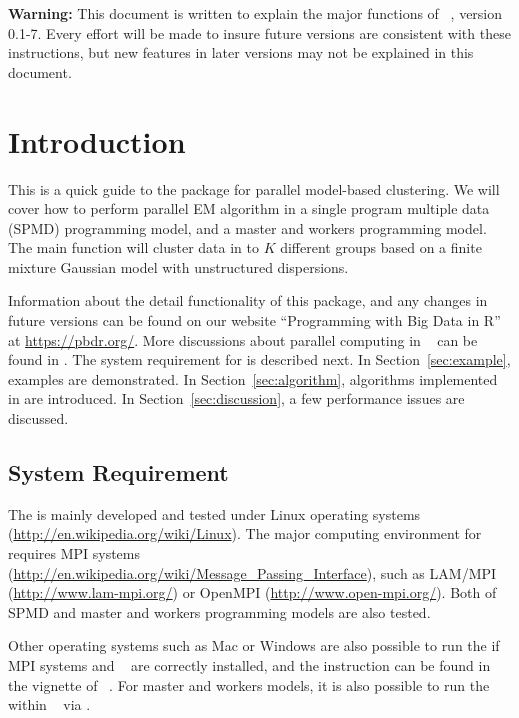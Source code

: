 
{\color{red} \bf Warning:} This document is written to explain the major
functions of
~\citep{Chen2012pmclustpackage}, version 0.1-7.
Every effort will be made to insure future versions are consistent with
these instructions, but new features in later versions may not be explained
in this document.


\section[Introduction]{Introduction}
\label{sec:introduction}

This is a quick guide to the package  for
parallel model-based clustering.
We will cover how to perform parallel EM algorithm in 
a single program multiple data (SPMD) programming model,
and a master and workers programming model.
The main function  will cluster
data in to $K$ different groups based on a finite mixture Gaussian
model with unstructured dispersions.

Information about the detail functionality of this package,
and any changes in future versions can be found on our website
``Programming with Big Data in R'' at
\url{https://pbdr.org/}.
More discussions about parallel computing in ~\citep{Rcore}
can be found in \citet{Schmidberger2009}.
The system requirement for  is described next.
In Section~\ref{sec:example}, examples are demonstrated.
In Section~\ref{sec:algorithm}, algorithms implemented in 
are introduced. In Section~\ref{sec:discussion}, a few performance issues
are discussed.




\subsection[System Requirement]{System Requirement}
\label{sec:system_requirement}

The  is mainly developed and tested under Linux operating systems
(\url{http://en.wikipedia.org/wiki/Linux}).
The major computing environment for  requires MPI systems
(\url{http://en.wikipedia.org/wiki/Message_Passing_Interface}), such as
LAM/MPI (\url{http://www.lam-mpi.org/}) or
OpenMPI (\url{http://www.open-mpi.org/}).
Both of SPMD and master and workers programming models are also tested.

Other operating systems such as Mac or Windows are also possible to run the
 if MPI systems and ~\citep{Chen2012pbdMPIpackage}
are correctly installed, and the instruction can be found in
the vignette of ~\citep{Chen2014pbdMPIvignette}.
For master and workers models,
it is also possible to run the  within ~\citep{Yu2010}
via .

